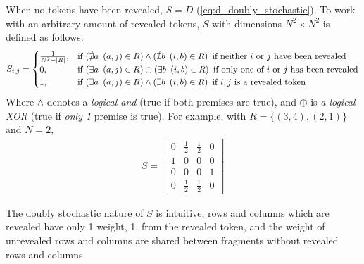 When no tokens have been revealed, $S=D$ (\autoref{eq:d_doubly_stochastic}). To work with an arbitrary amount of revealed tokens, $S$ with dimensions $N^2 \times N^2$ is defined as follows:
\begin{align}
S_{i,j}=
\begin{cases}
    \frac{1}{N^2-|R|},& \text{if $(\nexists a\enspace (a,j)\in R) \land (\nexists b\enspace (i,b)\in R)$\enspace if neither $i$ or $j$ have been revealed}\\
    0,& \text{if $(\exists a\enspace (a,j)\in R) \oplus (\exists b\enspace (i,b)\in R)$\enspace if only one of $i$ or $j$ has been revealed}\\
    1,& \text{if $(\exists a\enspace (a,j)\in R) \land (\exists b\enspace (i,b)\in R)$\enspace if $i,j$ is a revealed token}
\end{cases}
\label{eq:initialization_scheme}
\end{align}
Where $\land$ denotes a \emph{logical and} (true if both premises are true), and $\oplus$ is \emph{a logical XOR} (true if \emph{only 1} premise is true). For example, with $R=\{(3,4),(2,1)\}$ and $N=2$,
\begin{align}
    S=
    \begin{bmatrix}
        0&\frac{1}{2}&\frac{1}{2}&0\\
        1&0&0&0\\
        0&0&0&1\\
        0&\frac{1}{2}&\frac{1}{2}&0
    \end{bmatrix}
\end{align}

The doubly stochastic nature of $S$ is intuitive, rows and columns which are revealed have only 1 weight, 1, from the revealed token, and the weight of unrevealed rows and columns are shared between fragments without revealed rows and columns.

